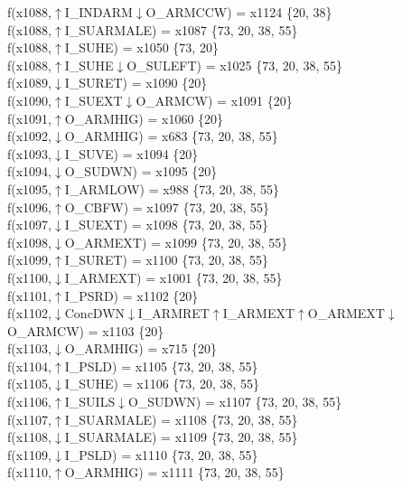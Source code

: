 f(x1088,$\uparrow$I\_INDARM$\downarrow$O\_ARMCCW) = x1124 \{20, 38\} \\  
f(x1088,$\uparrow$I\_SUARMALE) = x1087 \{73, 20, 38, 55\} \\  
f(x1088,$\uparrow$I\_SUHE) = x1050 \{73, 20\} \\  
f(x1088,$\uparrow$I\_SUHE$\downarrow$O\_SULEFT) = x1025 \{73, 20, 38, 55\} \\  
f(x1089,$\downarrow$I\_SURET) = x1090 \{20\} \\  
f(x1090,$\uparrow$I\_SUEXT$\downarrow$O\_ARMCW) = x1091 \{20\} \\  
f(x1091,$\uparrow$O\_ARMHIG) = x1060 \{20\} \\  
f(x1092,$\downarrow$O\_ARMHIG) = x683 \{73, 20, 38, 55\} \\  
f(x1093,$\downarrow$I\_SUVE) = x1094 \{20\} \\  
f(x1094,$\downarrow$O\_SUDWN) = x1095 \{20\} \\  
f(x1095,$\uparrow$I\_ARMLOW) = x988 \{73, 20, 38, 55\} \\  
f(x1096,$\uparrow$O\_CBFW) = x1097 \{73, 20, 38, 55\} \\  
f(x1097,$\downarrow$I\_SUEXT) = x1098 \{73, 20, 38, 55\} \\  
f(x1098,$\downarrow$O\_ARMEXT) = x1099 \{73, 20, 38, 55\} \\  
f(x1099,$\uparrow$I\_SURET) = x1100 \{73, 20, 38, 55\} \\  
f(x1100,$\downarrow$I\_ARMEXT) = x1001 \{73, 20, 38, 55\} \\  
f(x1101,$\uparrow$I\_PSRD) = x1102 \{20\} \\  
f(x1102,$\downarrow$ConcDWN$\downarrow$I\_ARMRET$\uparrow$I\_ARMEXT$\uparrow$O\_ARMEXT$\downarrow$O\_ARMCW) = x1103 \{20\} \\  
f(x1103,$\downarrow$O\_ARMHIG) = x715 \{20\} \\  
f(x1104,$\uparrow$I\_PSLD) = x1105 \{73, 20, 38, 55\} \\  
f(x1105,$\downarrow$I\_SUHE) = x1106 \{73, 20, 38, 55\} \\  
f(x1106,$\uparrow$I\_SUILS$\downarrow$O\_SUDWN) = x1107 \{73, 20, 38, 55\} \\  
f(x1107,$\uparrow$I\_SUARMALE) = x1108 \{73, 20, 38, 55\} \\  
f(x1108,$\downarrow$I\_SUARMALE) = x1109 \{73, 20, 38, 55\} \\  
f(x1109,$\downarrow$I\_PSLD) = x1110 \{73, 20, 38, 55\} \\  
f(x1110,$\uparrow$O\_ARMHIG) = x1111 \{73, 20, 38, 55\} \\  
